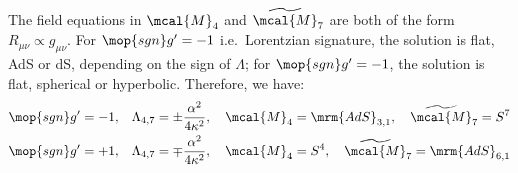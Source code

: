 \documentclass[a4paper,10pt]{article}
\begin{document}
\begin{enumerate}
\begin{enumerate}
	The field equations in $\mcal{M}_4$ and $\widetilde{\mcal{M}}_7$ are both of the form $
		R_{\mu\nu} \propto g_{\mu\nu}
	$. For $\mop{sgn} g' = -1$ i.e.\ Lorentzian signature, the solution is flat, AdS or dS, depending on the sign of $\Lambda$; for $\mop{sgn} g' = -1$, the solution is flat, spherical or hyperbolic. Therefore, we have:
	\begin{equation}
	\begin{aligned}
		\mop{sgn} g' = -1,
		&&&
		\Lambda_{4,7}
		= \pm \frac{\alpha^2}{4\kappa^2},\quad
		\mcal{M}_4 = \mrm{AdS}_{3,1},\quad
		\widetilde{\mcal{M}}_7 = S^7 \\
		\mop{sgn} g' = +1,
		&&&
		\Lambda_{4,7}
		= \mp \frac{\alpha^2}{4\kappa^2},\quad
		\mcal{M}_4 = S^4,\quad
		\widetilde{\mcal{M}}_7 = \mrm{AdS}_{6,1}
	\end{aligned}
	\end{equation}
	

\end{enumerate}
\end{enumerate}
\end{document}
